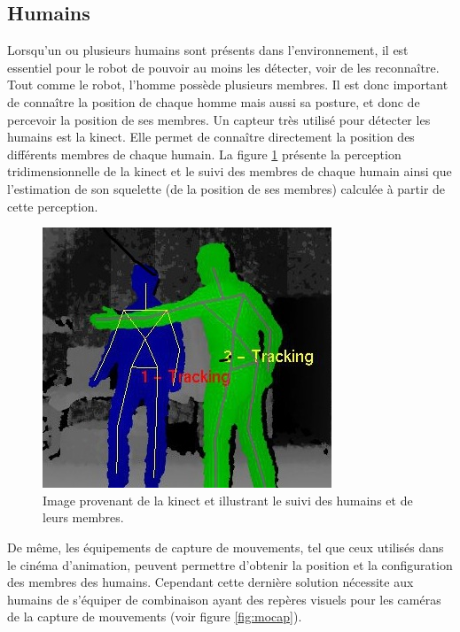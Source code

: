 \documentclass[a4paper,11pt,twoside]{StyleThese}
\begin{document}
\subsection{Humains}

Lorsqu'un ou plusieurs humains sont présents dans l'environnement, il est essentiel pour le robot de pouvoir au moins les détecter, voir de les reconnaître.
Tout comme le robot, l'homme possède plusieurs membres. Il est donc important de connaître la position de chaque homme mais aussi sa posture, et donc de percevoir la position de ses membres. Un capteur très utilisé pour détecter les humains est la kinect. Elle permet de connaître directement la position des différents membres de chaque humain. La figure \ref{fig:skeleton} présente la perception tridimensionnelle de la kinect et le suivi des membres de chaque humain ainsi que l'estimation de son squelette (de la position de ses membres) calculée à partir de cette perception.

\begin{figure}[ht!]
 \centering
  \includegraphics[width=0.59\linewidth]{./img/skeleton3.jpg} 
  \caption {Image provenant de la kinect et illustrant le suivi des humains et de leurs membres.}
  \label{fig:skeleton}
\end{figure}


De même, les équipements de capture de mouvements, tel que ceux utilisés dans le cinéma d'animation, peuvent permettre d'obtenir la position et la configuration des membres des humains. Cependant cette dernière solution nécessite aux humains de s'équiper de combinaison ayant des repères visuels pour les caméras de la capture de mouvements (voir figure \ref{fig:mocap}).
\end{document}
